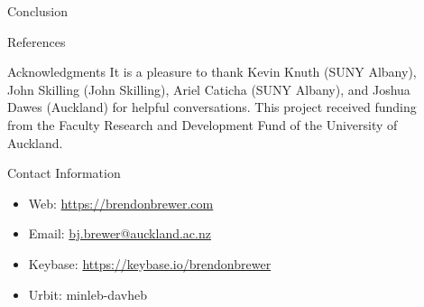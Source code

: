\documentclass[final,hyperref={pdfpagelabels=false}]{beamer}
\newcommand{\textapprox}{\raisebox{0.5ex}{\texttildelow}}
\begin{document}
\begin{frame}[t]
\begin{columns}[t]
\begin{column}{.465\textwidth}
\begin{block}{Conclusion}
\end{block}


\begin{block}{References}
        
\nocite{*} %
\small{
}

\end{block}


\begin{block}{Acknowledgments}
It is a pleasure to thank Kevin Knuth (SUNY Albany),
John Skilling (John Skilling), Ariel Caticha (SUNY Albany),
and Joshua Dawes (Auckland) for helpful
conversations. This project received funding from the Faculty Research
and Development Fund of the University of Auckland.

\end{block}



\begin{block}{Contact Information}

\begin{itemize}
\item Web: \href{https://brendonbrewer.com}{https://brendonbrewer.com}
\item Email: \href{mailto:bj.brewer@auckland.ac.nz}{bj.brewer@auckland.ac.nz}
\item Keybase: \href{https://keybase.io/brendonbrewer}{https://keybase.io/brendonbrewer}
\item Urbit: \textapprox minleb-davheb
\end{itemize}

\end{block}


\end{column} %

\begin{column}{.015\textwidth}\end{column} %

\end{columns} %

\end{frame} %
\end{document}
